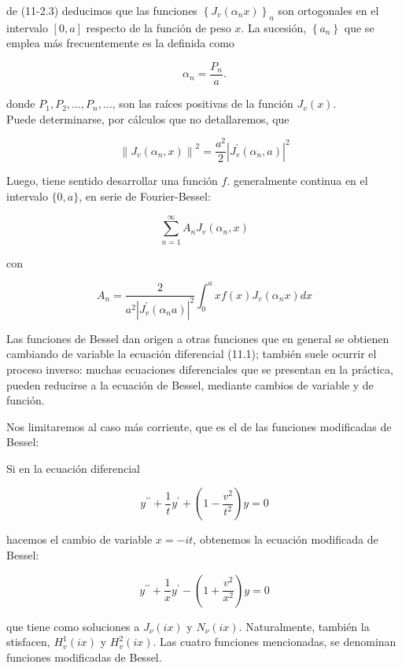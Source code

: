 \documentclass[10pt]{article}
\theoremstyle{plain}
\theoremstyle{definition}
\theoremstyle{remark}
\begin{document}
de (11-2.3) deducimos que las funciones $\left\{J_{v}\left(\alpha_{n} x\right)\right\}_{n}$ son ortogonales en el intervalo $[0, a]$ respecto de la función de peso $x$. La sucesión, $\left\{a_{n}\right\}$ que se emplea más frecuentemente es la definida como

$$
\alpha_{n}=\frac{P_{n}}{a} .
$$

donde $P_{1}, P_{2}, \ldots, P_{n}, \ldots$, son las raíces positivas de la función $J_{v}(x)$.\\
Puede determinarse, por cálculos que no detallaremos, que

$$
\left\|J_{v}\left(\alpha_{n}, x\right)\right\|^{2}=\frac{a^{2}}{2}\left|J_{v}^{\prime}\left(\alpha_{n}, a\right)\right|^{2}
$$

Luego, tiene sentido desarrollar una función $f$. generalmente continua en el intervalo $\{0, a\}$, en serie de Fourier-Bessel:

$$
\sum_{n=1}^{\infty} A_{n} J_{v}\left(\alpha_{n}, x\right)
$$

con

$$
A_{n}=\frac{2}{a^{2}\left|J_{v}^{\prime}\left(\alpha_{n} a\right)\right|^{2}} \int_{0}^{a} x f(x) J_{v}\left(\alpha_{n} x\right) d x
$$

Las funciones de Bessel dan origen a otras funciones que en general se obtienen cambiando de variable la ecuación diferencial (11.1); también suele ocurrir el proceso inverso: muchas ecuaciones diferenciales que se presentan en la práctica, pueden reducirse a la ecuación de Bessel, mediante cambios de variable y de función.

Nos limitaremos al caso más corriente, que es el de las funciones modificadas de Bessel:

Si en la ecuación diferencial

$$
y^{\prime \prime}+\frac{1}{t} y^{\prime}+\left(1-\frac{v^{2}}{t^{2}}\right) y=0
$$

hacemos el cambio de variable $x=-i t$, obtenemos la ecuación modificada de Bessel:


\begin{equation*}
y^{\prime \prime}+\frac{1}{x} y^{\prime}-\left(1+\frac{v^{2}}{x^{2}}\right) y=0 \tag{11-24}
\end{equation*}


que tiene como soluciones a $J_{\nu}(i x)$ y $N_{\nu}(i x)$. Naturalmente, también la stisfacen, $H_{v}^{1}(i x)$ y $H_{v}^{2}(i x)$. Las cuatro funciones mencionadas, se denominan funciones modificadas de Bessel.
\end{document}
